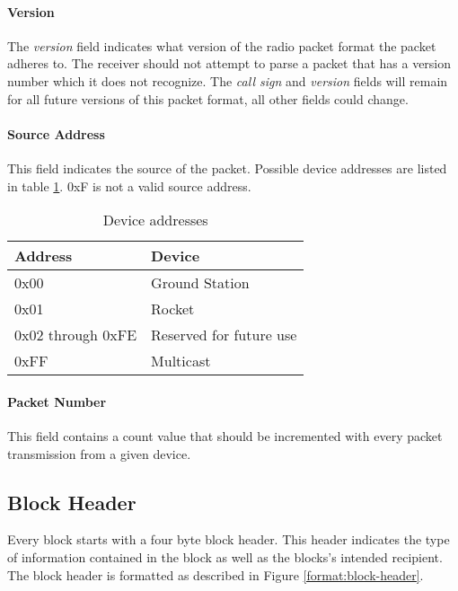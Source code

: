 \paragraph{Version}
The \emph{version} field indicates what version of the radio packet format the packet adheres to. The receiver should
not attempt to parse a packet that has a version number which it does not recognize. The \emph{call sign} and
\emph{version} fields will remain for all future versions of this packet format, all other fields could change.

\paragraph{Source Address}
This field indicates the source of the packet. Possible device addresses are listed in table \ref{table:dev-addresses}.
0xF is not a valid source address.

\begin{table}[H]
    \centering
    \begin{tabular}{@{}ll@{}}
        \toprule
        Address           & Device                  \\
        \midrule
        0x00              & Ground Station          \\
        0x01              & Rocket                  \\
        0x02 through 0xFE & Reserved for future use \\
        0xFF              & Multicast               \\
        \bottomrule
    \end{tabular}
    \caption{Device addresses}
    \label{table:dev-addresses}
\end{table}

\paragraph{Packet Number}
This field contains a count value that should be incremented with every packet transmission from a given device.

\subsection{Block Header}
Every block starts with a four byte block header. This header indicates the type of information contained in the block
as well as the blocks’s intended recipient. The block header is formatted as described in Figure
\ref{format:block-header}.

